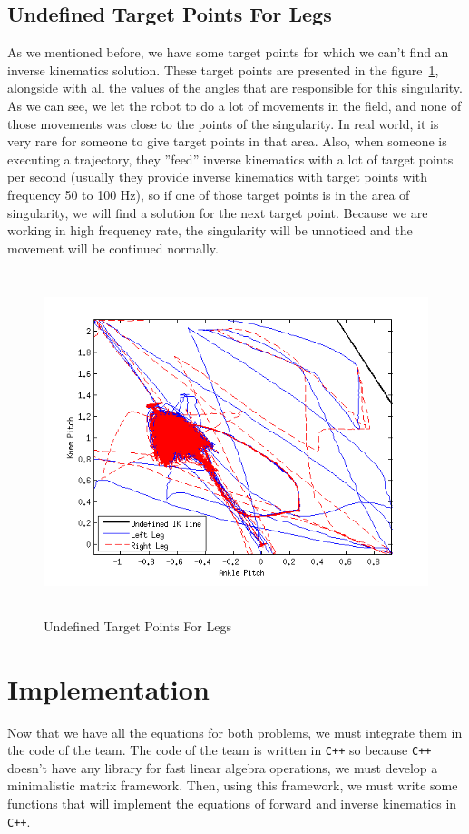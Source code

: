 \subsection{Undefined Target Points For Legs}
\label{undefined}
As we mentioned before, we have some target points for which we can't find an inverse kinematics solution. These target points are presented in the figure~\ref{fig:undefined}, alongside with all the values of the angles that are responsible for this singularity. As we can see, we let the robot to do a lot of movements in the field, and none of those movements was close to the points of the singularity. In real world, it is very rare for someone to give target points in that area. Also, when someone is executing a trajectory, they ''feed'' inverse kinematics with a lot of target points per second (usually they provide inverse kinematics with target points with frequency 50 to 100 Hz), so if one of those target points is in the area of singularity, we will find a solution for the next target point. Because we are working in high frequency rate, the singularity will be unnoticed and the movement will be continued normally.
\begin{figure}[h]
	\begin{center}
		\includegraphics[height = 10cm]{Figures/undefined.png}
 		\caption{Undefined Target Points For Legs}
 		\label{fig:undefined}
	\end{center}
\end{figure}


\section{Implementation}
Now that we have all the equations for both problems, we must integrate them in the code of the team. The code of the team is written in \verb!C++! so because \verb!C++! doesn't have any library for fast linear algebra operations, we must develop a minimalistic matrix framework. Then, using this framework, we must write some functions that will implement the equations of forward and inverse kinematics in \verb!C++!.
